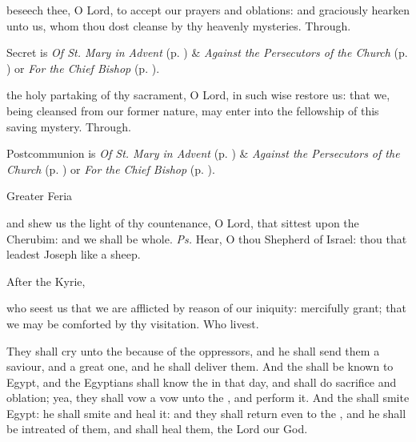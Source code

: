 \secret
{} beseech thee, O Lord, to accept our prayers and oblations: and graciously hearken unto us, whom thou dost cleanse by thy heavenly mysteries. Through.
\begin{rubric}
     Secret is \emph{Of St. Mary in Advent} (p. \pageref{SPMaryInAdvent}) \&  \emph{Against the Persecutors of the Church} (p. \pageref{SPAgainst}) or \emph{For the Chief Bishop} (p. \pageref{SPChiefBishop}).
\end{rubric}
\postcommunion
{} the holy partaking of thy sacrament, O Lord, in such wise restore us: that we, being cleansed from our former nature, may enter into the fellowship of this saving mystery. Through.
\begin{rubric}
     Postcommunion is \emph{Of St. Mary in Advent} (p. \pageref{SPMaryInAdvent}) \&  \emph{Against the Persecutors of the Church} (p. \pageref{SPAgainst}) or \emph{For the Chief Bishop} (p. \pageref{SPChiefBishop}).
\end{rubric}


\begin{inhead}
{Greater Feria}
\end{inhead}

\properantiphonfix

\introit
{} and shew us the light of thy countenance, O Lord, that sittest upon the Cherubim: and we shall be whole. \textit{Ps.} Hear, O thou Shepherd of Israel: thou that leadest Joseph like a sheep.
\begin{rubric}
    After the Kyrie,
\end{rubric}
\collect
{} who seest us that we are afflicted by reason of our iniquity: mercifully grant; that we may be comforted by thy visitation. Who livest.

 They shall cry unto the  because of the oppressors, and he shall send them a saviour, and a great one, and he shall deliver them. And the  shall be known to Egypt, and the Egyptians shall know the  in that day, and shall do sacrifice and oblation; yea, they shall vow a vow unto the , and perform it. And the  shall smite Egypt: he shall smite and heal it: and they shall return even to the , and he shall be intreated of them, and shall heal them,
the Lord our God.

